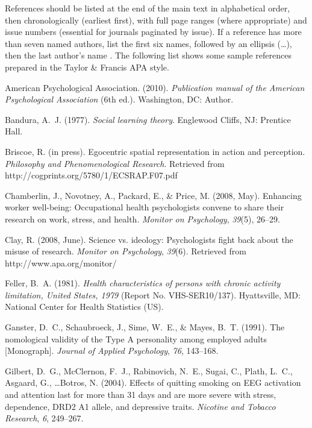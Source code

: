 \documentclass[]{interact}
\theoremstyle{plain}%
\theoremstyle{definition}
\theoremstyle{remark}
\begin{document}
References should be listed at the end of the main text in alphabetical order, then chronologically (earliest first), with full page ranges (where appropriate) and issue numbers (essential for journals paginated by issue). If a reference has more than seven named authors, list the first six names, followed by an ellipsis (\ldots), then the last author's name \cite[see for example][]{Gil04}.
The following list shows some sample references prepared in the Taylor \& Francis APA style.

\begin{thebibliography}{}

American Psychological Association. (2010). \emph {Publication manual of the
 American Psychological Association} (6th ed.). Washington, DC: Author.

Bandura, A.~J. (1977). \emph{Social learning theory}. Englewood Cliffs, NJ:
 Prentice Hall.

Briscoe, R. (in press). {Egocentric spatial representation in action and
 perception}. \emph{Philosophy and Phenomenological Research}. Retrieved from
 http://cogprints.org/5780/1/ECSRAP.F07.pdf

Chamberlin, J., Novotney, A., Packard, E., \& Price, M. (2008, May).
 Enhancing worker well-being: Occupational health psychologists convene to
 share their research on work, stress, and health. \emph{Monitor on
 Psychology}, \emph{39}(5), 26--29.

Clay, R. (2008, June). Science vs. ideology: Psychologists fight back about the
 misuse of research. \emph{Monitor on Psychology}, \emph{39}(6). Retrieved from
 http://www.apa.org/monitor/

Feller, B.~A. (1981). \emph{Health characteristics of persons with chronic
 activity limitation, United States, 1979} (Report No. VHS-SER10/137).
 Hyattsville, MD: National Center for Health Statistics (US).

Ganster, D.~C., Schaubroeck, J., Sime, W.~E., \& Mayes, B.~T. (1991).
 The nomological validity of the Type A personality among employed adults
 [Monograph]. \emph{Journal of Applied Psychology}, \emph{76}, 143--168.

Gilbert, D.~G., McClernon, F.~J., Rabinovich, N.~E., Sugai, C., Plath, L.~C.,
 Asgaard, G., \ldots Botros, N. (2004). Effects of quitting smoking on EEG
 activation and attention last for more than 31 days and are more severe with
 stress, dependence, DRD2 A1 allele, and depressive traits. \emph{Nicotine
 and Tobacco Research}, \emph{6}, 249--267.


\end{thebibliography}
\end{document}
